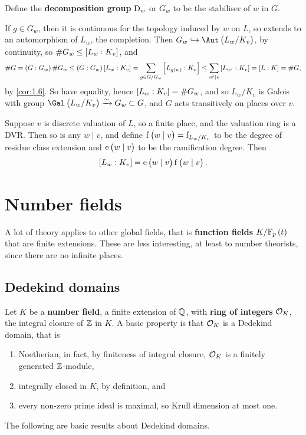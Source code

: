 \begin{definition*}
Define the \textbf{decomposition group} $ \mathrm{D}_w $ or $ G_w $ to be the stabiliser of $ w $ in $ G $.
\end{definition*}

If $ g \in G_w $, then it is continuous for the topology induced by $ w $ on $ L $, so extends to an automorphism of $ L_w $, the completion. Then $ G_w \hookrightarrow \Aut\br{L_w / K_v} $, by continuity, so $ \#G_w \le \sbr{L_w : K_v} $, and
$$ \#G = \br{G : G_w}\#G_w \le \br{G : G_w}\sbr{L_w : K_v} = \sum_{g \in G / G_w} \sbr{L_{g\br{w}} : K_v} \le \sum_{w' \mid v} \sbr{L_{w'} : K_v} = \sbr{L : K} = \#G, $$
by \ref{cor:1.6}. So have equality, hence $ \sbr{L_w : K_v} = \#G_w $, and so $ L_w / K_v $ is Galois with group $ \Gal\br{L_w / K_v} \xrightarrow{\sim} G_w \subset G $, and $ G $ acts transitively on places over $ v $.

\begin{notation*}
Suppose $ v $ is discrete valuation of $ L $, so a finite place, and the valuation ring is a DVR. Then so is any $ w \mid v $, and define $ \f\br{w \mid v} = \f_{L_w / K_v} $ to be the degree of residue class extension and $ \e\br{w \mid v} $ to be the ramification degree. Then
$$ \sbr{L_w : K_v} = \e\br{w \mid v}\f\br{w \mid v}. $$
\end{notation*}

\pagebreak

\section{Number fields}

\begin{remark*}
A lot of theory applies to other global fields, that is \textbf{function fields} $ K / \FF_p\br{t} $ that are finite extensions. These are less interesting, at least to number theorists, since there are no infinite places.
\end{remark*}

\subsection{Dedekind domains}

Let $ K $ be a \textbf{number field}, a finite extension of $ \mathbb{Q} $, with \textbf{ring of integers} $ \mathcal{O}_K $, the integral closure of $ \mathbb{Z} $ in $ K $. A basic property is that $ \mathcal{O}_K $ is a Dedekind domain, that is
\begin{enumerate}
\item Noetherian, in fact, by finiteness of integral closure, $ \mathcal{O}_K $ is a finitely generated $ \mathbb{Z} $-module,
\item integrally closed in $ K $, by definition, and
\item every non-zero prime ideal is maximal, so Krull dimension at most one.
\end{enumerate}
The following are basic results about Dedekind domains.

